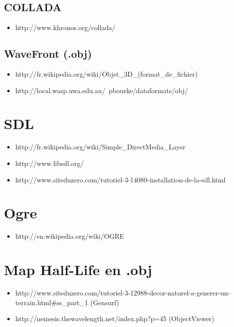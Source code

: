 \documentclass[a4paper,12pt]{report}
\begin{document}
\subsection*{COLLADA}
\begin{itemize}
 \item http://www.khronos.org/collada/
\end{itemize}

\subsection*{WaveFront (.obj)}
\begin{itemize}
 \item http://fr.wikipedia.org/wiki/Objet\_3D\_(format\_de\_fichier)
 
 \item http://local.wasp.uwa.edu.au/~pbourke/dataformats/obj/
\end{itemize}


\section*{SDL}
\begin{itemize}
 \item http://fr.wikipedia.org/wiki/Simple\_DirectMedia\_Layer

 \item http://www.libsdl.org/

 \item http://www.siteduzero.com/tutoriel-3-14080-installation-de-la-sdl.html
\end{itemize}


\section*{Ogre}
\begin{itemize}
 \item http://en.wikipedia.org/wiki/OGRE
\end{itemize}
   

\section*{Map Half-Life en .obj}
\begin{itemize}
 \item http://www.siteduzero.com/tutoriel-3-12988-decor-naturel-a-generer-un-terrain.html\#ss\_part\_1  (Gensurf)
 
 \item http://nemesis.thewavelength.net/index.php?p=45  (ObjectViewer)
\end{itemize}
\end{document}
